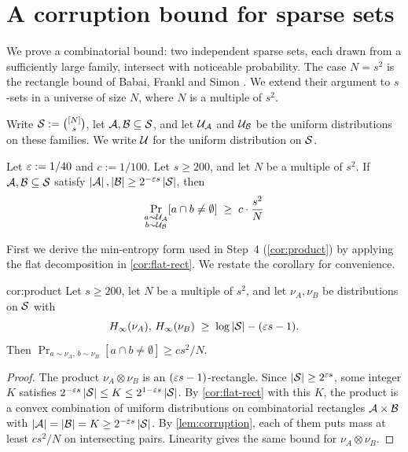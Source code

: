 \section{A corruption bound for sparse sets}\label{sec:corruption}

We prove a combinatorial bound: two independent sparse sets, each drawn from a sufficiently large family, intersect with noticeable probability. The case $N=s^2$ is the rectangle bound of Babai, Frankl and Simon \cite{babai_complexity_1986}. We extend their argument to $s$-sets in a universe of size $N$, where $N$ is a multiple of $s^2$.

Write $\mathcal{S}:=\binom{[N]}s$, let $\mathcal{A},\mathcal{B}\subseteq\mathcal{S}$, and let $\mathcal{U}_{\mathcal{A}}$ and $\mathcal{U}_{\mathcal{B}}$ be the uniform distributions on these families. We write $\mathcal{U}$ for the uniform distribution on $\mathcal{S}$.

\begin{lemma}\label{lem:corruption}
Let $\varepsilon := 1/40$ and $c := 1/100$. Let $s \ge 200$, and let $N$ be a multiple of $s^2$. If $\mathcal{A}, \mathcal{B} \subseteq \mathcal{S}$ satisfy $\left|\mathcal{A}\right|, \left|\mathcal{B}\right| \ge 2^{-\varepsilon s}\left|\mathcal{S}\right|$, then
\begin{equation*}
    \Pr_{\substack{ a \sim\mathcal{U}_{\mathcal{A}} \\ b \sim \mathcal{U}_{\mathcal{B}}}}[a \cap b \ne \emptyset] \;\ge\; c\cdot\frac{s^2}{N}
\end{equation*}
\end{lemma}

First we derive the min-entropy form used in Step~4 (\cref{cor:product}) by applying the flat decomposition in \cref{cor:flat-rect}. We restate the corollary for convenience.

\begin{repcorollary}{cor:product}
Let $s \ge 200$, let $N$ be a multiple of $s^2$, and let $\nu_A, \nu_B$ be distributions on $\mathcal{S}$ with
\[ H_\infty(\nu_A),\, H_\infty(\nu_B) \;\ge\; \log\left|\mathcal{S}\right| - (\varepsilon s - 1). \]
Then $\Pr_{a \sim \nu_A,\, b \sim \nu_B}[a \cap b \ne \emptyset] \ge c s^2/N$.
\end{repcorollary}
\begin{proof}
The product $\nu_A \otimes \nu_B$ is an $(\varepsilon s - 1)$-rectangle. Since $\left|\mathcal{S}\right| \ge 2^{\varepsilon s}$, some integer $K$ satisfies $2^{-\varepsilon s}\left|\mathcal{S}\right| \le K \le 2^{1 - \varepsilon s}\left|\mathcal{S}\right|$. By \cref{cor:flat-rect} with this $K$, the product is a convex combination of uniform distributions on combinatorial rectangles $\mathcal{A} \times \mathcal{B}$ with $\left|\mathcal{A}\right| = \left|\mathcal{B}\right| = K \ge 2^{-\varepsilon s}\left|\mathcal{S}\right|$. By \cref{lem:corruption}, each of them puts mass at least $c s^2/N$ on intersecting pairs. Linearity gives the same bound for $\nu_A \otimes \nu_B$.
\end{proof}

